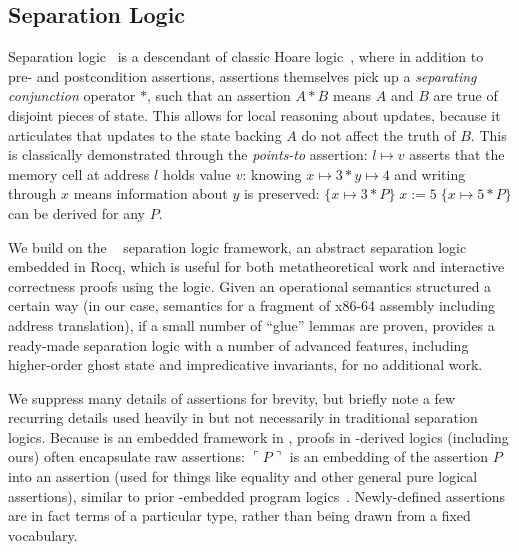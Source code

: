\subsection{Separation Logic}
\label{sec:seplogic}
Separation logic~\cite{reynolds02} is a descendant of classic Hoare logic~\cite{hoare69},
where in addition to pre- and postcondition assertions, assertions themselves pick up a
\emph{separating conjunction} operator $\ast$, such that an assertion $A\ast B$ means $A$ and $B$ are true
of disjoint pieces of state. This allows for local reasoning about updates, because it articulates
that updates to the state backing $A$ do not affect the truth of $B$. This is classically demonstrated
through the \emph{points-to} assertion: $l\mapsto v$ asserts that the memory cell at address $l$ holds value $v$:
knowing $x\mapsto 3\ast y\mapsto 4$ and writing through $x$ means information about $y$ is preserved:
$\{x\mapsto 3\ast P\}\;x\mathrel{:=}5\;\{x\mapsto 5 \ast P\}$ can be derived for any $P$.

We build on the \iris~\cite{jung2018iris} separation logic framework,
an abstract separation logic embedded in Rocq, which is useful for both metatheoretical work
and interactive correctness proofs using the logic. Given an operational
semantics structured a certain way (in our case, semantics for
a fragment of x86-64 assembly including address translation),
if a small number of ``glue'' lemmas are proven, \iris
provides a ready-made separation logic with a number of advanced features, including
higher-order ghost state and impredicative invariants, for no additional work.

We suppress many details of \iris assertions for brevity, but briefly note
a few recurring details used heavily in \iris but not necessarily in traditional
separation logics.
Because \iris is an embedded framework in \rocq, proofs in \iris-derived
logics (including ours) often encapsulate raw \rocq assertions: $\ulcorner P \urcorner$ is an embedding
of the \rocq assertion $P$ into an \iris assertion (used for things like equality and other
general pure logical assertions), similar to prior \rocq-embedded program logics~\cite{Chlipala2013Bedrock}. Newly-defined \iris assertions are in fact
\rocq terms of a particular type, rather than being drawn from a fixed vocabulary.

